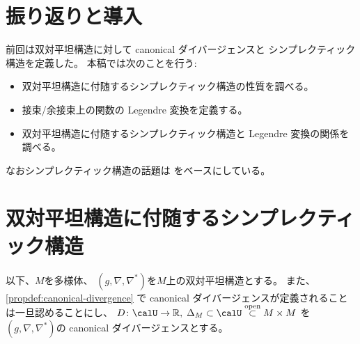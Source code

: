 \documentclass[report]{jlreq}
\begin{document}
%

%
\section*{振り返りと導入}

前回は双対平坦構造に対して canonical ダイバージェンスと
シンプレクティック構造を定義した。
本稿では次のことを行う:
\begin{itemize}
    \item 双対平坦構造に付随するシンプレクティック構造の性質を調べる。
    \item 接束/余接束上の関数の Legendre 変換を定義する。
    \item 双対平坦構造に付随するシンプレクティック構造と Legendre 変換の関係を調べる。
\end{itemize}

なおシンプレクティック構造の話題は
\cite{_bayes_2020}
をベースにしている。

%
\section{双対平坦構造に付随するシンプレクティック構造}

以下、$M$を多様体、
$(g, \nabla, \nabla^*)$を$M$上の双対平坦構造とする。
また、
\cref{propdef:canonical-divergence}
で canonical ダイバージェンスが定義されることは一旦認めることにし、
$D \colon \calU \to \R, \;
    \Delta_M \subset \calU \opensubset M \times M$
を$(g, \nabla, \nabla^*)$の canonical ダイバージェンスとする。
\end{document}
